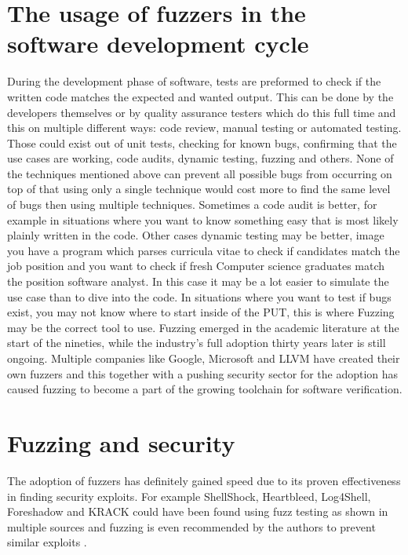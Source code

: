 \section{The usage of fuzzers in the software development cycle}
\label{intro:SoftwareDevelopmentCycle}
During the development phase of software, tests are preformed to check if the written code matches the expected and wanted output. This can be done by the developers themselves or by quality assurance testers which do this full time and this on multiple different ways: code review, manual testing or automated testing. Those could exist out of unit tests, checking for known bugs, confirming that the use cases are working, code audits, dynamic testing, fuzzing and others. None of the techniques mentioned above can prevent all possible bugs from occurring on top of that using only a single technique would cost more to find the same level of bugs then using multiple techniques. Sometimes a code audit is better, for example in situations where you want to know something easy that is most likely plainly written in the code. Other cases dynamic testing may be better, image you have a program which parses curricula vitae to check if candidates match the job position and you want to check if fresh Computer science graduates match the position software analyst. In this case it may be a lot easier to simulate the use case than to dive into the code. In situations where you want to test if bugs exist, you may not know where to start inside of the PUT, this is where Fuzzing may be the correct tool to use. Fuzzing emerged in the academic literature at the start of the nineties, while the industry's full adoption thirty years later is still ongoing. Multiple companies like Google, Microsoft and LLVM have created their own fuzzers and this together with a pushing security sector for the adoption has caused fuzzing to become a part of the growing toolchain for software verification.

\section{Fuzzing and security}  %
\label{intro:FussingSecurity}
The adoption of fuzzers has definitely gained speed due to its proven effectiveness in finding security exploits. For example ShellShock, Heartbleed, Log4Shell, Foreshadow and KRACK could have been found using fuzz testing as shown in multiple sources \cite{HeartbleedViaFuzzing, 34ForeshadowViaFuzz, ShellShockViaFuzzing, Log4ShellViaFuzzing} and fuzzing is even recommended by the authors to prevent similar exploits \cite{35ForeshadowFuzzRecom, 33KrackViaFuzz}.

